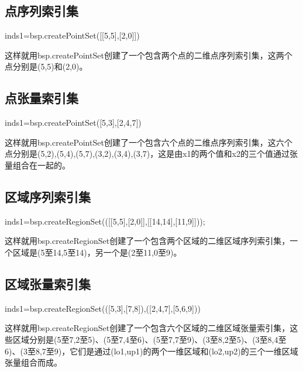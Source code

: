 \documentclass{article}
\begin{document}
\subsection{点序列索引集}
\begin{python}
inds1=bsp.createPointSet([[5,5],[2,0]])
\end{python}
这样就用bsp.createPointSet创建了一个包含两个点的二维点序列索引集，这两个点分别是(5,5)和(2,0)。

\subsection{点张量索引集}
\begin{python}
inds1=bsp.createPointSet([5,3],[2,4,7])
\end{python}
这样就用bsp.createPointSet创建了一个包含六个点的二维点序列索引集，这六个点分别是(5,2),(5,4),(5,7),(3,2),(3,4),(3,7)，这是由x1的两个值和x2的三个值通过张量组合在一起的。

\subsection{区域序列索引集}
\begin{python}
inds1=bsp.createRegionSet(([[5,5],[2,0]],[[14,14],[11,9]]));
\end{python}
这样就用bsp.createRegionSet创建了一个包含两个区域的二维区域序列索引集，一个区域是(5至14,5至14)，另一个是(2至11,0至9)。

\subsection{区域张量索引集}
\begin{python}
inds1=bsp.createRegionSet(([5,3],[7,8]),([2,4,7],[5,6,9]))
\end{python}
这样就用bsp.createRegionSet创建了一个包含六个区域的二维区域张量索引集，这些区域分别是(5至7,2至5)、(5至7,4至6)、(5至7,7至9)、(3至8,2至5)、(3至8,4至6)、(3至8,7至9)，它们是通过(lo1,up1)的两个一维区域和(lo2,up2)的三个一维区域张量组合而成。 
\end{document}
